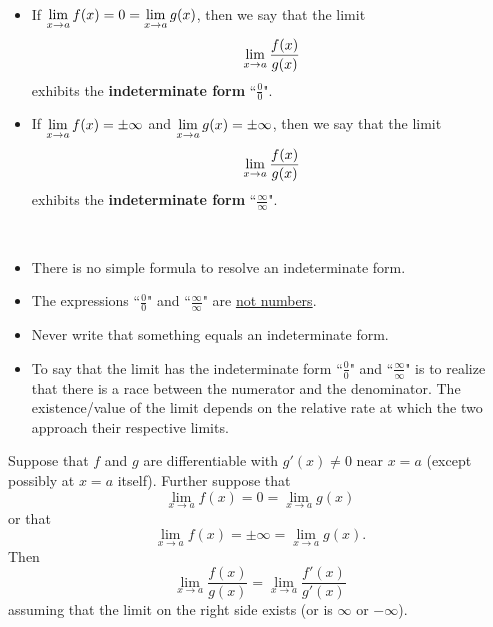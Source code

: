 \newpage

\begin{definition}\,
\begin{itemize}
\item If $\displaystyle\lim_{x\to a}f(x) =  0 = \lim_{x\to a}g(x)$, then we say that the limit $$\displaystyle\lim_{x\to a}\frac{f(x)}{g(x)}$$ exhibits  the \textbf{indeterminate form} ``$\frac{0}{0}$".
\item If $\displaystyle\lim_{x\to a}f(x) = \pm\infty$ and $\displaystyle\lim_{x\to a}g(x) = \pm\infty$, then we say that the limit $$\displaystyle\lim_{x\to a}\frac{f(x)}{g(x)}$$ exhibits  the \textbf{indeterminate form} ``$\frac{\infty}{\infty}$".
\end{itemize}
\end{definition}

\begin{remark}\,
\begin{itemize}
\item There is no simple formula to resolve an indeterminate form.
\item The expressions ``$\frac{0}{0}$" and ``$\frac{\infty}{\infty}$" are \underline{not numbers}.
\item Never write that something equals an indeterminate form.
\item To say that the limit has the indeterminate form ``$\frac{0}{0}$" and ``$\frac{\infty}{\infty}$" is to realize that there is a race between the numerator and the denominator.
The existence/value of the limit depends on the relative rate at which the two approach their respective limits.
\end{itemize}
\end{remark}

\begin{theorem}
Suppose that $f$ and $g$ are differentiable with $g'(x)\ne 0$ near $x=a$ (except possibly at $x=a$ itself).
Further suppose that 
\begin{equation*}
\lim_{x\to a}f(x) = 0 = \lim_{x\to a}g(x)
\end{equation*}
or that
\begin{equation*}
\lim_{x\to a}f(x) = \pm\infty = \lim_{x\to a}g(x).
\end{equation*}
Then
\begin{equation*}
\lim_{x\to a}\frac{f(x)}{g(x)} = \lim_{x\to a}\frac{f'(x)}{g'(x)}
\end{equation*}
assuming that the limit on the right side exists (or is $\infty$ or $-\infty$).
\end{theorem}

